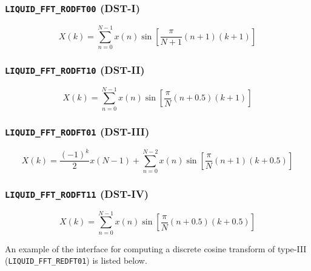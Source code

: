 \subsubsection{{\tt LIQUID\_FFT\_RODFT00} (DST-I)}
\label{module:fft:r2r:RODFT00}
    \begin{equation}
    \label{eqn:fft:dst-I}
        X(k) =  \sum_{n=0}^{N-1}{
                    x(n) \sin\left[
                        \frac{\pi}{N+1}(n+1)(k+1)
                    \right]
                }
    \end{equation}

\subsubsection{{\tt LIQUID\_FFT\_RODFT10} (DST-II)}
\label{module:fft:r2r:RODFT10}
    \begin{equation}
    \label{eqn:fft:dst-II}
        X(k) =  \sum_{n=0}^{N-1}{
                    x(n) \sin\left[
                        \frac{\pi}{N}(n+0.5)(k+1)
                    \right]
                }
    \end{equation}

\subsubsection{{\tt LIQUID\_FFT\_RODFT01} (DST-III)}
\label{module:fft:r2r:RODFT01}
    \begin{equation}
    \label{eqn:fft:dst-III}
        X(k) =  \frac{(-1)^k}{2}x(N-1) + 
                \sum_{n=0}^{N-2}{
                    x(n) \sin\left[
                        \frac{\pi}{N}(n+1)(k+0.5)
                    \right]
                }
    \end{equation}

\subsubsection{{\tt LIQUID\_FFT\_RODFT11} (DST-IV)}
\label{module:fft:r2r:RODFT11}
    \begin{equation}
    \label{eqn:fft:dst-IV}
        X(k) =  \sum_{n=0}^{N-1}{
                    x(n) \sin\left[
                        \frac{\pi}{N}(n+0.5)(k+0.5)
                    \right]
                }
    \end{equation}

An example of the interface for computing a discrete cosine transform
of type-III ({\tt LIQUID\_FFT\_REDFT01}) is listed below.
%


